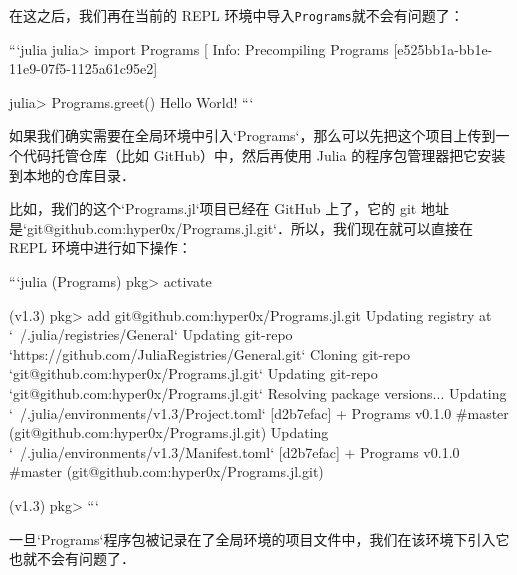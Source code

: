 在这之后，我们再在当前的 REPL 环境中导入\verb|Programs|就不会有问题了：

```julia
julia> import Programs
[ Info: Precompiling Programs [e525bb1a-bb1e-11e9-07f5-1125a61c95e2]

julia> Programs.greet()
Hello World!
```

如果我们确实需要在全局环境中引入`Programs`，那么可以先把这个项目上传到一个代码托管仓库（比如 GitHub）中，然后再使用 Julia 的程序包管理器把它安装到本地的仓库目录． 

比如，我们的这个`Programs.jl`项目已经在 GitHub 上了，它的 git 地址是`git@github.com:hyper0x/Programs.jl.git`．所以，我们现在就可以直接在 REPL 环境中进行如下操作：

```julia
(Programs) pkg> activate

(v1.3) pkg> add git@github.com:hyper0x/Programs.jl.git
  Updating registry at `~/.julia/registries/General`
  Updating git-repo `https://github.com/JuliaRegistries/General.git`
   Cloning git-repo `git@github.com:hyper0x/Programs.jl.git`
  Updating git-repo `git@github.com:hyper0x/Programs.jl.git`
 Resolving package versions...
  Updating `~/.julia/environments/v1.3/Project.toml`
  [d2b7efac] + Programs v0.1.0 #master (git@github.com:hyper0x/Programs.jl.git)
  Updating `~/.julia/environments/v1.3/Manifest.toml`
  [d2b7efac] + Programs v0.1.0 #master (git@github.com:hyper0x/Programs.jl.git)

(v1.3) pkg> 
```

一旦`Programs`程序包被记录在了全局环境的项目文件中，我们在该环境下引入它也就不会有问题了．